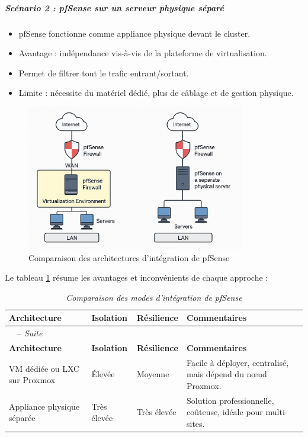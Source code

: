 \subparagraph{Scénario 2 : pfSense sur un serveur physique séparé}

\begin{itemize}
	\item pfSense fonctionne comme appliance physique devant le cluster.
	\item Avantage : indépendance vis-à-vis de la plateforme de virtualisation.
	\item Permet de filtrer tout le trafic entrant/sortant.
	\item Limite : nécessite du matériel dédié, plus de câblage et de gestion physique.
\end{itemize}

\begin{figure}[H]
	\centering
	\includegraphics[width=0.85\textwidth]{figures/choix implementation pfsense.png}
	\caption{Comparaison des architectures d'intégration de pfSense}
\end{figure}

Le tableau \ref{tab:pfsense_arch} résume les avantages et inconvénients de chaque approche :

\begin{longtable}{|p{4.5cm}|p{3.5cm}|p{3cm}|p{3.5cm}|}
	\caption{\it{Comparaison des modes d’intégration de pfSense}}
	\label{tab:pfsense_arch}                                                                                                               \\ \hline
	\textbf{Architecture}        & \textbf{Isolation} & \textbf{Résilience} & \textbf{Commentaires}                                        \\ \hline
	\endfirsthead
	\multicolumn{4}{l}{\tablename\ \thetable\ -- \textit{Suite}}                                                                           \\ \hline
	\textbf{Architecture}        & \textbf{Isolation} & \textbf{Résilience} & \textbf{Commentaires}                                        \\ \hline
	\endhead
	\endfoot
	\hline
	\endlastfoot

	VM dédiée ou LXC sur Proxmox & Élevée             & Moyenne             & Facile à déployer, centralisé, mais dépend du nœud Proxmox.  \\ \hline
	Appliance physique séparée   & Très élevée        & Très élevée         & Solution professionnelle, coûteuse, idéale pour multi-sites. \\ \hline
\end{longtable}

